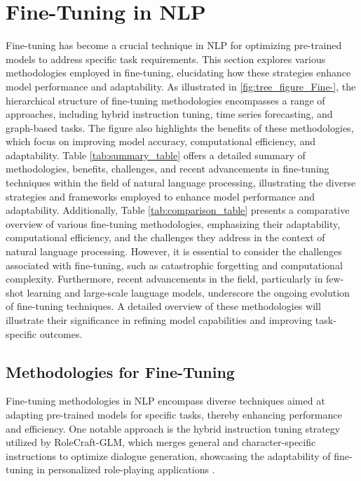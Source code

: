 \section{Fine-Tuning in NLP} \label{sec:Fine-Tuning in NLP}



Fine-tuning has become a crucial technique in NLP for optimizing pre-trained models to address specific task requirements. This section explores various methodologies employed in fine-tuning, elucidating how these strategies enhance model performance and adaptability. As illustrated in \autoref{fig:tree_figure_Fine-}, the hierarchical structure of fine-tuning methodologies encompasses a range of approaches, including hybrid instruction tuning, time series forecasting, and graph-based tasks. The figure also highlights the benefits of these methodologies, which focus on improving model accuracy, computational efficiency, and adaptability. Table \ref{tab:summary_table} offers a detailed summary of methodologies, benefits, challenges, and recent advancements in fine-tuning techniques within the field of natural language processing, illustrating the diverse strategies and frameworks employed to enhance model performance and adaptability. Additionally, Table \ref{tab:comparison_table} presents a comparative overview of various fine-tuning methodologies, emphasizing their adaptability, computational efficiency, and the challenges they address in the context of natural language processing. However, it is essential to consider the challenges associated with fine-tuning, such as catastrophic forgetting and computational complexity. Furthermore, recent advancements in the field, particularly in few-shot learning and large-scale language models, underscore the ongoing evolution of fine-tuning techniques. A detailed overview of these methodologies will illustrate their significance in refining model capabilities and improving task-specific outcomes.








\subsection{Methodologies for Fine-Tuning} \label{subsec:Methodologies for Fine-Tuning}



Fine-tuning methodologies in NLP encompass diverse techniques aimed at adapting pre-trained models for specific tasks, thereby enhancing performance and efficiency. One notable approach is the hybrid instruction tuning strategy utilized by RoleCraft-GLM, which merges general and character-specific instructions to optimize dialogue generation, showcasing the adaptability of fine-tuning in personalized role-playing applications \cite{tao2024rolecraftglmadvancingpersonalizedroleplaying}.

